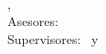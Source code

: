 \begin{titlepage}
	\thesisDate \\

\end{titlepage}


\hfill
\vfill
{
	\small
	\textbf{\thesisName} \\
	\textit{\thesisTitle} \\
	\thesisSubject, \thesisDate \\
	Asesores: \thesisFirstReviewer\ \\ %
	Supervisores: \thesisFirstSupervisor\ y \thesisSecondSupervisor \\[1.5em]
	\textbf{\thesisUniversity} \\
	\textit{\thesisUniversityGroup} \\
	\thesisUniversityInstitute \\
	\thesisUniversityDepartment \\
	\thesisUniversityStreetAddress \\
	\thesisUniversityPostalCode\
}
